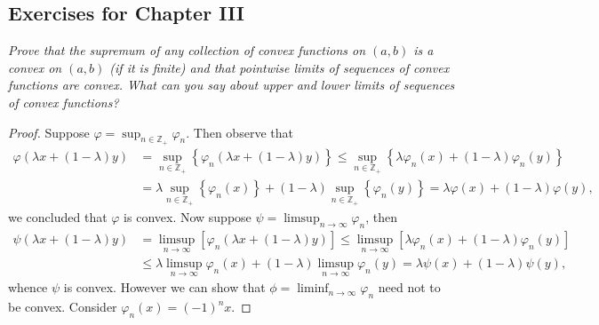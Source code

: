 \subsection{Exercises for Chapter III}
\begin{problem}\em
Prove that the supremum of any collection of convex functions on $(a,b)$ is a convex on $(a,b)$ (if it is finite) and that pointwise limits of sequences of convex functions are convex. What can you say about upper and lower limits of sequences of convex functions?
\end{problem}
\begin{proof}
Suppose $\varphi=\sup_{n\in\mathbb{Z}_+}\varphi_n$. Then observe that 
$$
\begin{aligned}
\varphi \left( \lambda x+\left( 1-\lambda \right) y \right) &=\mathop {\mathrm{sup}} \limits_{n\in \mathbb{Z} _+}\left\{ \varphi _n\left( \lambda x+\left( 1-\lambda \right) y \right) \right\} \le \mathop {\mathrm{sup}} \limits_{n\in \mathbb{Z} _+}\left\{ \lambda \varphi _n\left( x \right) +\left( 1-\lambda \right) \varphi _n\left( y \right) \right\} 
\\
&=\lambda \mathop {\mathrm{sup}} \limits_{n\in \mathbb{Z} _+}\left\{ \varphi _n\left( x \right) \right\} +\left( 1-\lambda \right) \mathop {\mathrm{sup}} \limits_{n\in \mathbb{Z} _+}\left\{ \varphi _n\left( y \right) \right\} =\lambda \varphi \left( x \right) +\left( 1-\lambda \right) \varphi \left( y \right) ,
\end{aligned}
$$
we concluded that $\varphi$ is convex. Now suppose $\psi=\limsup_{n\to\infty}\varphi_n$, then 
$$
\begin{aligned}
\psi \left( \lambda x+\left( 1-\lambda \right) y \right) &=\mathop {\lim\mathrm{sup}} \limits_{n\rightarrow \infty}\left[ \varphi _n\left( \lambda x+\left( 1-\lambda \right) y \right) \right] \le \mathop {\lim\mathrm{sup}} \limits_{n\rightarrow \infty}\left[ \lambda \varphi _n\left( x \right) +\left( 1-\lambda \right) \varphi _n\left( y \right) \right] 
\\
&\le \lambda \mathop {\lim\mathrm{sup}} \limits_{n\rightarrow \infty}\varphi _n\left( x \right) +\left( 1-\lambda \right) \mathop {\lim\mathrm{sup}} \limits_{n\rightarrow \infty}\varphi _n\left( y \right) =\lambda \psi \left( x \right) +\left( 1-\lambda \right) \psi \left( y \right) ,
\end{aligned}
$$
whence $\psi$ is convex. However we can show that $\phi=\liminf_{n\to\infty}\varphi_n$ need not to be convex. Consider $\varphi_n(x)=(-1)^nx$.
\end{proof}
